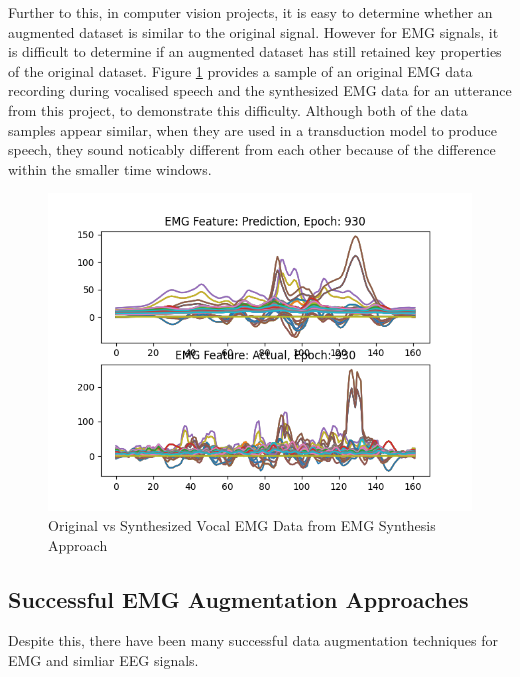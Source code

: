 Further to this, in computer vision projects, it is easy to determine whether
an augmented dataset is similar to the original signal. However for EMG
signals, it is difficult to determine if an augmented dataset has still
retained key properties of the original dataset.
Figure \ref{fig:real-vs-pred-emg} provides a sample of an original
EMG data recording during vocalised speech and the synthesized EMG
data for an utterance from this project, to demonstrate this difficulty.
Although both of the data samples appear similar, when they are used in
a transduction model to produce speech, they sound noticably different from
each other because of the difference within the smaller time windows.

\begin{figure}[hbtp]
    \caption{Original vs Synthesized Vocal EMG Data from EMG Synthesis Approach}
    \label{fig:real-vs-pred-emg}
    \centering
    \includegraphics[width=0.75\linewidth]{graphics/emg_augment/real_vs_synth.png}
\end{figure}

\subsection{Successful EMG Augmentation Approaches}

Despite this, there have been many successful data augmentation techniques
for EMG and simliar EEG signals.
